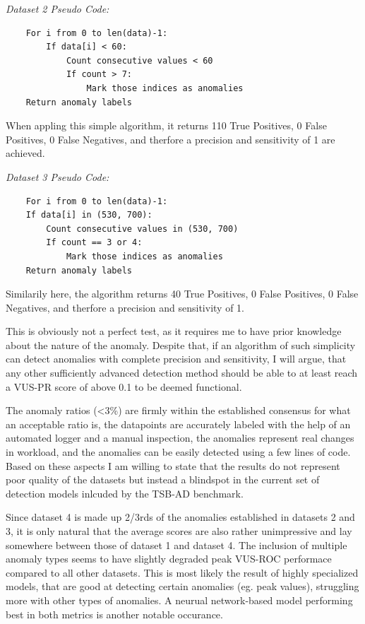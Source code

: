 \documentclass[12pt,oneside]{article}
\begin{document}
\textit{Dataset 2 Pseudo Code:} \par
\begin{lstlisting}
    For i from 0 to len(data)-1:
        If data[i] < 60:
            Count consecutive values < 60
            If count > 7:
                Mark those indices as anomalies
    Return anomaly labels
\end{lstlisting}
\par
When appling this simple algorithm, it returns 110 True Positives, 0 False Positives, 0 False Negatives, and therfore a precision and sensitivity of 1 are achieved.\par
\textit{Dataset 3 Pseudo Code:} \par
\begin{lstlisting}
    For i from 0 to len(data)-1:
    If data[i] in (530, 700):
        Count consecutive values in (530, 700)
        If count == 3 or 4:
            Mark those indices as anomalies
    Return anomaly labels
\end{lstlisting}
\par
Similarily here, the algorithm returns 40 True Positives, 0 False Positives, 0 False Negatives, and therfore a precision and sensitivity of 1. \par
This is obviously not a perfect test, as it requires me to have prior knowledge about the nature of the anomaly. Despite that, if an algorithm of such simplicity can detect anomalies with complete precision and sensitivity, I will argue, that any other sufficiently advanced detection method should be able to at least reach a VUS-PR score of above 0.1 to be deemed functional.\par
The anomaly ratios (<3\%) are firmly within the established consensus for what an acceptable ratio is, the datapoints are accurately labeled with the help of an automated logger and a manual inspection, the anomalies represent real changes in workload, and the anomalies can be easily detected using a few lines of code. Based on these aspects I am willing to state that the results do not represent poor quality of the datasets but instead a blindspot in the current set of detection models inlcuded by the TSB-AD benchmark. \par
Since dataset 4 is made up 2/3rds of the anomalies established in datasets 2 and 3, it is only natural that the average scores are also rather unimpressive and lay somewhere between those of dataset 1 and dataset 4. The inclusion of multiple anomaly types seems to have slightly degraded peak VUS-ROC performace compared to all other datasets. This is most likely the result of highly specialized models, that are good at detecting certain anomalies (eg. peak values), struggling more with other types of anomalies. A neurual network-based model performing best in both metrics is another notable occurance.
\end{document}
